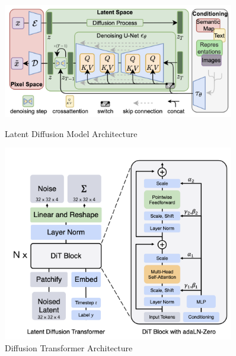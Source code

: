 \documentclass[conference]{IEEEtran}
\begin{document}
\begin{figure}[H]
    \begin{minipage}{0.50\textwidth}
    \centering
        \includegraphics[width=0.9\textwidth]{figures/figure4.png}
        \caption{Latent Diffusion Model Architecture} \label{fig:fig4}
    \end{minipage}
    \begin{minipage}{0.50\textwidth}
        \includegraphics[width=0.9\textwidth]{figures/figure5.png}
        \caption{Diffusion Transformer Architecture} \label{fig:fig5}
    \end{minipage}
\end{figure} \FloatBarrier
\end{document}
